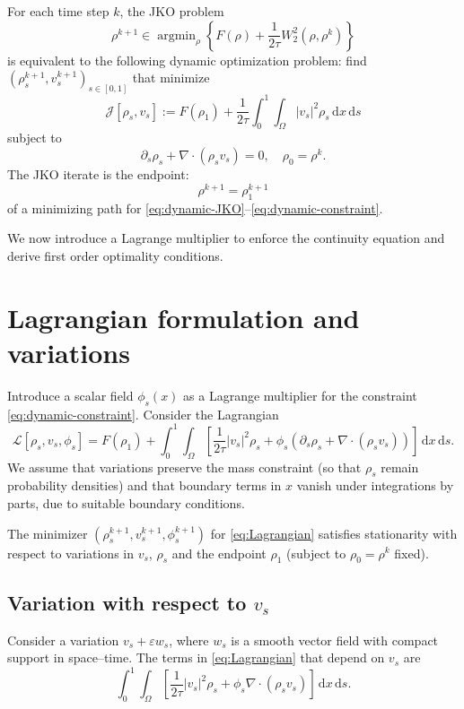 \documentclass[11pt]{article}
\numberwithin{equation}{section}
\theoremstyle{definition}
\newcommand{\dd}{\,\mathrm{d}}
\begin{document}
For each time step $k$, the JKO problem
\[
\rho^{k+1} \in \operatorname{argmin}_\rho
\left\{
F(\rho) + \frac{1}{2\tau}W_2^2(\rho,\rho^k)
\right\}
\]
is equivalent to the following dynamic optimization problem: find $(\rho_s^{k+1},v_s^{k+1})_{s\in[0,1]}$ that minimize
\begin{equation}
\label{eq:dynamic-JKO}
\mathcal{J}[\rho_s,v_s]
:= F(\rho_1) + \frac{1}{2\tau}\int_0^1\!\!\int_{\Omega} |v_s|^2 \rho_s\dd x\dd s
\end{equation}
subject to
\begin{equation}
\label{eq:dynamic-constraint}
\partial_s \rho_s + \nabla\cdot(\rho_s v_s) = 0,\quad
\rho_0 = \rho^k.
\end{equation}
The JKO iterate is the endpoint:
\[
\rho^{k+1} = \rho_1^{k+1}
\]
of a minimizing path for \eqref{eq:dynamic-JKO}--\eqref{eq:dynamic-constraint}.

We now introduce a Lagrange multiplier to enforce the continuity equation and derive first order optimality conditions.

\section{Lagrangian formulation and variations}

Introduce a scalar field $\phi_s(x)$ as a Lagrange multiplier for the constraint \eqref{eq:dynamic-constraint}. Consider the Lagrangian
\begin{equation}
\label{eq:Lagrangian}
\mathcal{L}[\rho_s,v_s,\phi_s]
=
F(\rho_1)
+ \int_0^1\!\!\int_{\Omega}
\left[
\frac{1}{2\tau} |v_s|^2 \rho_s
+ \phi_s\left(\partial_s \rho_s
+ \nabla\cdot(\rho_s v_s)\right)
\right]\dd x\dd s.
\end{equation}
We assume that variations preserve the mass constraint (so that $\rho_s$ remain probability densities) and that boundary terms in $x$ vanish under integrations by parts, due to suitable boundary conditions.

The minimizer $(\rho_s^{k+1},v_s^{k+1},\phi_s^{k+1})$ for \eqref{eq:Lagrangian} satisfies stationarity with respect to variations in $v_s$, $\rho_s$ and the endpoint $\rho_1$ (subject to $\rho_0 = \rho^k$ fixed).

\subsection{Variation with respect to $v_s$}

Consider a variation $v_s + \varepsilon w_s$, where $w_s$ is a smooth vector field with compact support in space--time. The terms in \eqref{eq:Lagrangian} that depend on $v_s$ are
\[
\int_0^1\!\!\int_{\Omega}
\left[
\frac{1}{2\tau} |v_s|^2 \rho_s
+ \phi_s \nabla\cdot(\rho_s v_s)
\right]\dd x\dd s.
\]
\end{document}
